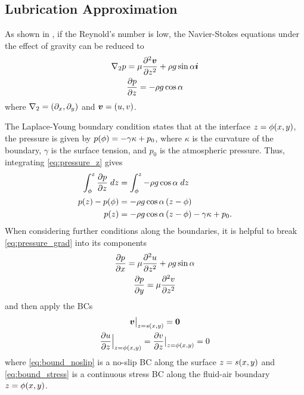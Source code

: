 \subsection{Lubrication Approximation}
As shown in \cite{kondic2003instabilities}, if the Reynold's number is low, the Navier-Stokes equations under the effect of gravity can be reduced to 
\begin{gather}
    \nabla_2 p = \mu \frac{\partial^2 \boldsymbol{v}}{\partial z^2} + \rho g \sin\alpha \boldsymbol{i} 
    \label{eq:pressure_grad}\\
    \frac{\partial p}{\partial z} = -\rho g \cos \alpha
    \label{eq:pressure_z}
\end{gather}
where $\nabla_2 = \left( \partial_x, \partial_y \right)$ and $\boldsymbol{v} = \left( u, v \right)$.

The Laplace-Young boundary condition states that at the interface $z = \phi\!\left( x, y \right)$, the pressure is given by 
$p\!\left( \phi \right) = -\gamma \kappa + p_0$, where $\kappa$ is the curvature of the boundary, $\gamma$ is the surface tension, and $p_0$ is the atmospheric pressure. 
Thus, integrating \cref{eq:pressure_z} gives 
\begin{align}
    \nonumber \int_{\phi}^{z} \frac{\partial p}{\partial z} \; dz &=  \int_{\phi}^{z} -\rho g \cos \alpha \; dz\\
    \nonumber p\!\left( z \right) - p\!\left( \phi \right) &= -\rho g \cos \alpha \left( z - \phi \right)\\
    p\!\left( z \right) &= -\rho g \cos \alpha \left( z - \phi \right) -\gamma \kappa + p_0.  
    \label{eq:laplace_young}
\end{align}
When considering further conditions along the boundaries, it is helpful to break \cref{eq:pressure_grad} into its components
\begin{gather}
    \frac{\partial p}{\partial x} = \mu \frac{\partial^2 u}{\partial z^2} + \rho g \sin\alpha 
    \label{eq:pressure_x}\\
    \frac{\partial p}{\partial y} = \mu \frac{\partial^2 v}{\partial z^2}
    \label{eq:pressure_y}
\end{gather}
and then apply the BCs
\begin{gather}
    \evalat{\vect{v}}{z = s\lrp{x,y}} = \vect{0}
    \label{eq:bound_noslip}\\
    \evalat[\Big]{\pderiv{u}{z}}{z = \phi\lrp{x,y}} = \evalat{\pderiv{v}{z}}{z = \phi\lrp{x,y}} = 0
    \label{eq:bound_stress}
\end{gather}
where \cref{eq:bound_noslip} is a no-slip BC along the surface $z = s\!\left( x,y \right)$ and \cref{eq:bound_stress}
is a continuous stress BC along the fluid-air boundary $z = \phi\!\left( x,y \right)$. 

